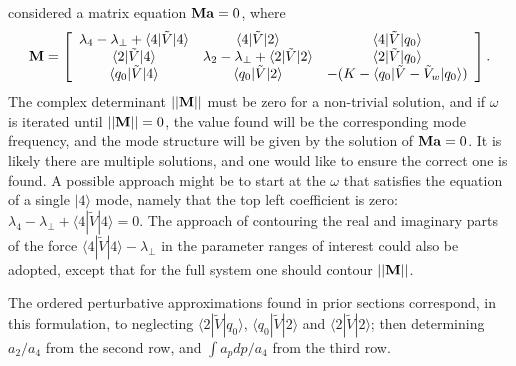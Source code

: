\documentclass[12pt]{article}
\def\ket#1{|#1\rangle}
\def\bra#1{\langle#1}
\def\a{{\bf a}}
\def\M{{\bf M}}
\begin{document}
considered a matrix equation $\M\a=0$, where
\begin{equation}
  \label{aveq}
  \M=\left[
  \begin{array}{ccc}
    \lambda_4-\lambda_\perp+\bra{4}|\tilde V\ket{4}
    &\bra{4}|\tilde V\ket{2}&\bra{4}|\tilde V\ket{q_0}\\
    \bra{2}|\tilde V\ket{4}
    &\lambda_2-\lambda_\perp+\bra{2}|\tilde
      V\ket{2}&\bra{2}|\tilde V\ket{q_0}\\
    \bra{q_0}|\tilde V\ket{4}
    &\bra{q_0}|\tilde V\ket{2}&-(K-\bra{q_0}|\tilde V-\tilde V_w\ket{q_0})
  \end{array}\right]
\iffalse
\left[
  \begin{array}{c}
    a_4\\
    a_2\\
    \int a_pdp
  \end{array}\right]=0.
\fi.
\end{equation}
The complex determinant $||\M||$ must be zero for a non-trivial
solution, and if $\omega$ is iterated until $||\M||=0$, the value
found will be the corresponding mode frequency, and the mode structure
will be given by the solution of $\M\a=0$. It is likely there are
multiple solutions, and one would like to ensure the correct one is
found. A possible approach might be to start at the $\omega$ that
satisfies the equation of a single $\ket{4}$ mode, namely that the top
left coefficient is zero:
$\lambda_4-\lambda_\perp+\bra{4}|\tilde V\ket{4}=0$.  The approach of
contouring the real and imaginary parts of the force
$\bra{4}|\tilde V\ket{4}-\lambda_\perp$ in the parameter ranges of
interest could also be adopted, except that for the full system one
should contour $||\M||$.

The ordered perturbative approximations found in prior sections correspond,
in this formulation, to neglecting $\bra{2}|\tilde V\ket{q_0}$,
$\bra{q_0}|\tilde V\ket{2}$ and $\bra{2}|\tilde V\ket{2}$; then
determining $a_2/a_4$ from the second row, and $\int a_pdp/a_4$ from the third
row.
\end{document}
